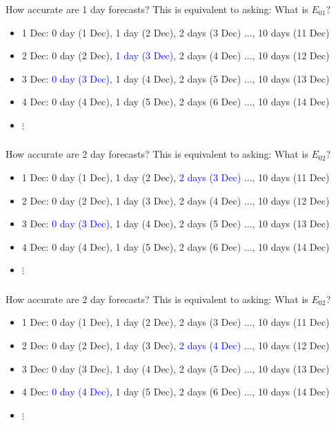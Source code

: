 \documentclass[aspectratio=169]{beamer}
\begin{document}
\begin{frame}
\frametitle{}

How accurate are 1 day forecasts? This is equivalent to asking:  What is $E_{01}$?
\begin{itemize}
\item 1 Dec: 0 day (1 Dec), 1 day (2 Dec), 2 days (3 Dec) $\ldots$, 10 days (11 Dec)
\item 2 Dec: 0 day (2 Dec), \textcolor{blue}{1 day (3 Dec)}, 2 days (4 Dec) $\ldots$, 10 days (12 Dec)
\item 3 Dec: \textcolor{blue}{0 day (3 Dec)}, 1 day (4 Dec), 2 days (5 Dec) $\ldots$, 10 days (13 Dec)
\item 4 Dec: 0 day (4 Dec), 1 day (5 Dec), 2 days (6 Dec) $\ldots$, 10 days (14 Dec)
\item $\vdots$
\end{itemize}

\end{frame}
\begin{frame}
\frametitle{}

How accurate are 2 day forecasts? This is equivalent to asking:  What is $E_{02}$?
\begin{itemize}
\item 1 Dec: 0 day (1 Dec), 1 day (2 Dec), \textcolor{blue}{2 days (3 Dec)} $\ldots$, 10 days (11 Dec)
\item 2 Dec: 0 day (2 Dec), 1 day (3 Dec), 2 days (4 Dec) $\ldots$, 10 days (12 Dec)
\item 3 Dec: \textcolor{blue}{0 day (3 Dec)}, 1 day (4 Dec), 2 days (5 Dec) $\ldots$, 10 days (13 Dec)
\item 4 Dec: 0 day (4 Dec), 1 day (5 Dec), 2 days (6 Dec) $\ldots$, 10 days (14 Dec)
\item $\vdots$
\end{itemize}

\end{frame}
\begin{frame}
\frametitle{}

How accurate are 2 day forecasts? This is equivalent to asking:  What is $E_{02}$?
\begin{itemize}
\item 1 Dec: 0 day (1 Dec), 1 day (2 Dec), 2 days (3 Dec) $\ldots$, 10 days (11 Dec)
\item 2 Dec: 0 day (2 Dec), 1 day (3 Dec), \textcolor{blue}{2 days (4 Dec)} $\ldots$, 10 days (12 Dec)
\item 3 Dec: 0 day (3 Dec), 1 day (4 Dec), 2 days (5 Dec) $\ldots$, 10 days (13 Dec)
\item 4 Dec: \textcolor{blue}{0 day (4 Dec)}, 1 day (5 Dec), 2 days (6 Dec) $\ldots$, 10 days (14 Dec)
\item $\vdots$
\end{itemize}

\end{frame}
\end{document}
